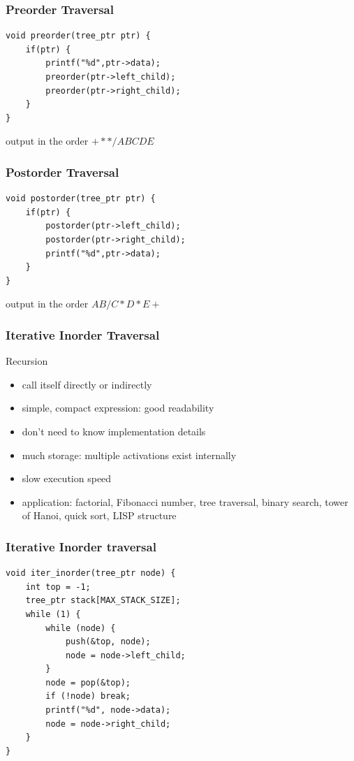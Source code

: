 \documentclass[newPxFont,sthlmFooter,nooffset]{beamer}
\begin{document}
\begin{frame}[t, fragile]
  \frametitle{Preorder Traversal}

\begin{lstlisting}
void preorder(tree_ptr ptr) { 
    if(ptr) {
        printf("%d",ptr->data); 
        preorder(ptr->left_child); 
        preorder(ptr->right_child);
    } 
}  
\end{lstlisting}

output in the order $+**/ABCDE$

\end{frame}


\begin{frame}[t, fragile]
  \frametitle{Postorder Traversal}
\begin{lstlisting}
void postorder(tree_ptr ptr) { 
    if(ptr) {
        postorder(ptr->left_child); 
        postorder(ptr->right_child);
        printf("%d",ptr->data); 
    } 
}  
\end{lstlisting}

output in the order $AB/C*D*E+$

\end{frame}


\begin{frame}[t]
  \frametitle{Iterative Inorder Traversal}
Recursion
\begin{itemize}
\item call itself directly or indirectly
\item simple, compact expression: good
readability
\item don’t need to know implementation
details
\item much storage: multiple activations
exist internally
\item  slow execution speed
\item  application: factorial, Fibonacci
number, tree traversal, binary search, tower of Hanoi, quick sort, LISP structure
\end{itemize}
\end{frame}


\begin{frame}[t, fragile]
  \frametitle{Iterative Inorder traversal}
  \begin{lstlisting}
void iter_inorder(tree_ptr node) { 
    int top = -1;
    tree_ptr stack[MAX_STACK_SIZE]; 
    while (1) {
        while (node) {
            push(&top, node);
            node = node->left_child;
        }
        node = pop(&top);
        if (!node) break; 
        printf("%d", node->data); 
        node = node->right_child;
    } 
}    
  \end{lstlisting}
\end{frame}
\end{document}
